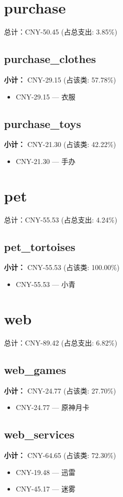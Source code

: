 \documentclass[12pt]{article}
\begin{document}
\section*{purchase}
总计：CNY-50.45 	 (占总支出: 3.85\%)

\subsection*{purchase\_clothes}
\textbf{小计：} CNY-29.15 (占该类: 57.78\%)
\begin{itemize}
    \item CNY-29.15 --- 衣服
\end{itemize}
\subsection*{purchase\_toys}
\textbf{小计：} CNY-21.30 (占该类: 42.22\%)
\begin{itemize}
    \item CNY-21.30 --- 手办
\end{itemize}
\section*{pet}
总计：CNY-55.53 	 (占总支出: 4.24\%)

\subsection*{pet\_tortoises}
\textbf{小计：} CNY-55.53 (占该类: 100.00\%)
\begin{itemize}
    \item CNY-55.53 --- 小青
\end{itemize}
\section*{web}
总计：CNY-89.42 	 (占总支出: 6.82\%)

\subsection*{web\_games}
\textbf{小计：} CNY-24.77 (占该类: 27.70\%)
\begin{itemize}
    \item CNY-24.77 --- 原神月卡
\end{itemize}
\subsection*{web\_services}
\textbf{小计：} CNY-64.65 (占该类: 72.30\%)
\begin{itemize}
    \item CNY-19.48 --- 迅雷
    \item CNY-45.17 --- 迷雾
\end{itemize}
\end{document}
